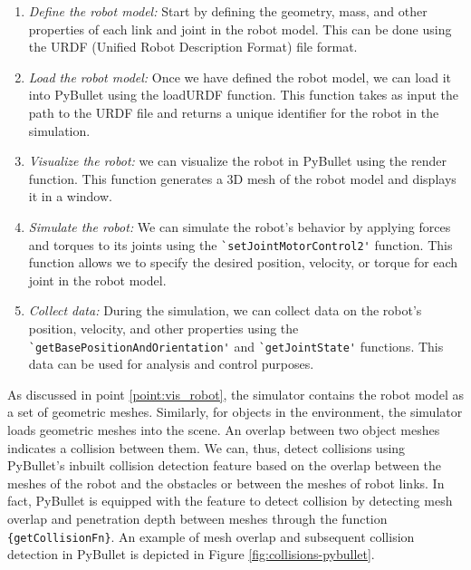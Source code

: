\begin{enumerate}
    \item \textit{Define the robot model:} Start by defining the geometry, mass, and other properties of each link and joint in the robot model. This can be done using the URDF (Unified Robot Description Format) file format.
    \item \textit{Load the robot model:} Once we have defined the robot model, we can load it into PyBullet using the loadURDF function. This function takes as input the path to the URDF file and returns a unique identifier for the robot in the simulation.
    \item \textit{Visualize the robot:}\label{point:vis_robot} we can visualize the robot in PyBullet using the render function. This function generates a 3D mesh of the robot model and displays it in a window.
    \item \textit{Simulate the robot:} We can simulate the robot's behavior by applying forces and torques to its joints using the \verb_`setJointMotorControl2'_ function. This function allows we to specify the desired position, velocity, or torque for each joint in the robot model.
    \item \textit{Collect data:} During the simulation, we can collect data on the robot's position, velocity, and other properties using the \verb_`getBasePositionAndOrientation'_ and \verb_`getJointState'_ functions. This data can be used for analysis and control purposes.
\end{enumerate}

As discussed in point \ref{point:vis_robot}, the simulator contains the robot model as a set of geometric meshes. Similarly, for objects in the environment, the simulator loads geometric meshes into the scene. An overlap between two object meshes indicates a collision between them. We can, thus, detect collisions using PyBullet's inbuilt collision detection feature based on the overlap between the meshes of the robot and the obstacles or between the meshes of robot links. In fact, PyBullet is equipped with the feature to detect collision by detecting mesh overlap and penetration depth between meshes through the function \verb_{getCollisionFn}_. An example of mesh overlap and subsequent collision detection in PyBullet is depicted in Figure \ref{fig:collisions-pybullet}.

